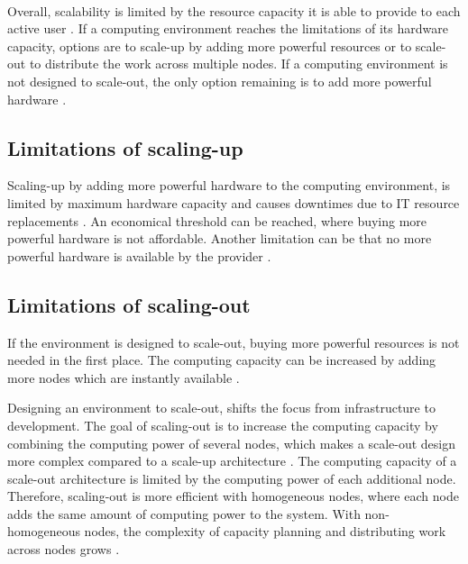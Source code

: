 \documentclass{article}
\begin{document}
\paragraph{}
Overall, scalability is limited by the resource capacity it is able to provide to each active user \cite{Wilder2012CloudPatterns}.
If a computing environment reaches the limitations of its hardware capacity, options are to scale-up by adding more powerful resources or to scale-out to distribute the work across multiple nodes. If a computing environment is not designed to scale-out, the only option remaining is to add more powerful hardware \cite{Abbot2011ScalabilityRules}.


\subsection{Limitations of scaling-up}
Scaling-up by adding more powerful hardware to the computing environment, is limited by maximum hardware capacity and causes downtimes due to IT resource replacements \cite{Mahmood2013CloudConcepts}. An economical threshold can be reached, where buying more powerful hardware is not affordable. Another limitation can be that no more powerful hardware is available by the provider \cite{Abbot2011ScalabilityRules, Wilder2012CloudPatterns}.


\subsection{Limitations of scaling-out}
If the environment is designed to scale-out, buying more powerful resources is not needed in the first place. The computing capacity can be increased by adding more nodes which are instantly available \cite{Abbot2011ScalabilityRules}.


Designing an environment to scale-out, shifts the focus from infrastructure to development. The goal of scaling-out is to increase the computing capacity by combining the computing power of several nodes, which makes a scale-out design more complex compared to a scale-up architecture \cite{Wilder2012CloudPatterns}. The computing capacity of a scale-out architecture is limited by the computing power of each additional node. Therefore, scaling-out is more efficient with homogeneous nodes, where each node adds the same amount of computing power to the system. With non-homogeneous nodes, the complexity of capacity planning and distributing work across nodes grows \cite{Wilder2012CloudPatterns}. 
\end{document}
